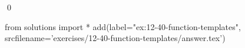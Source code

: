 
\begin{ex}
  \label{ex:12-40-function-templates}
  
  \qed
\end{ex}
\begin{python0}
from solutions import *
add(label="ex:12-40-function-templates",
    srcfilename='exercises/12-40-function-templates/answer.tex')
\end{python0}
